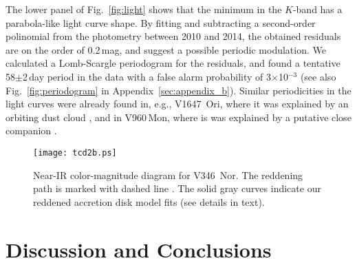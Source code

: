 \documentclass{aa}
\begin{document}
The lower panel of Fig.~\ref{fig:light} shows that the minimum in the
$K$-band has a parabola-like light curve shape. By fitting and
subtracting a second-order polinomial from the photometry between 2010
and 2014, the obtained residuals are on the order of 0.2\,mag, and
suggest a possible periodic modulation. We calculated a Lomb-Scargle
periodogram for the residuals, and found a tentative 58$\pm$2\,day
period in the data with a false alarm probability of
3$\times$10$^{-3}$ (see also Fig.~\ref{fig:periodogram} in
Appendix~\ref{sec:appendix_b}). Similar periodicities in the light
curves were already found in, e.g., V1647~Ori, where it was explained
by an orbiting dust cloud \citep{acosta2007}, and in V960\,Mon, where
is was explained by a putative close companion \citep{hackstein2015}.

\begin{figure}
\centering
\texttt{[image: tcd2b.ps]}
\caption{Near-IR color-magnitude diagram for V346~Nor. The reddening
  path is marked with dashed line \citep{cardelli1989}. The solid gray
  curves indicate our reddened accretion disk model fits (see details
  in text).}
\label{fig:tcd}
\end{figure}



\section{Discussion and Conclusions}
\end{document}
